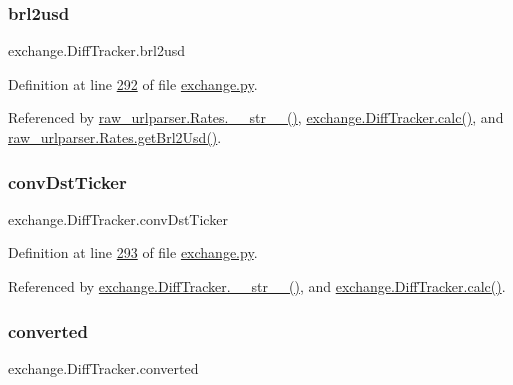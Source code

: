 \subsubsection{\texorpdfstring{brl2usd}{brl2usd}}
{\footnotesize\ttfamily exchange.\+Diff\+Tracker.\+brl2usd}



Definition at line \hyperlink{exchange_8py_source_l00292}{292} of file \hyperlink{exchange_8py_source}{exchange.\+py}.



Referenced by \hyperlink{raw__urlparser_8py_source_l00038}{raw\+\_\+urlparser.\+Rates.\+\_\+\+\_\+str\+\_\+\+\_\+()}, \hyperlink{exchange_8py_source_l00309}{exchange.\+Diff\+Tracker.\+calc()}, and \hyperlink{raw__urlparser_8py_source_l00029}{raw\+\_\+urlparser.\+Rates.\+get\+Brl2\+Usd()}.

\mbox{\label{classexchange_1_1_diff_tracker_a8eb45d1c936bc32a5732d59a387265dc}} 
\subsubsection{\texorpdfstring{conv\+Dst\+Ticker}{convDstTicker}}
{\footnotesize\ttfamily exchange.\+Diff\+Tracker.\+conv\+Dst\+Ticker}



Definition at line \hyperlink{exchange_8py_source_l00293}{293} of file \hyperlink{exchange_8py_source}{exchange.\+py}.



Referenced by \hyperlink{exchange_8py_source_l00336}{exchange.\+Diff\+Tracker.\+\_\+\+\_\+str\+\_\+\+\_\+()}, and \hyperlink{exchange_8py_source_l00309}{exchange.\+Diff\+Tracker.\+calc()}.

\mbox{\label{classexchange_1_1_diff_tracker_a3dac3e23c410307f41327725701fbd10}} 
\subsubsection{\texorpdfstring{converted}{converted}}
{\footnotesize\ttfamily exchange.\+Diff\+Tracker.\+converted}



